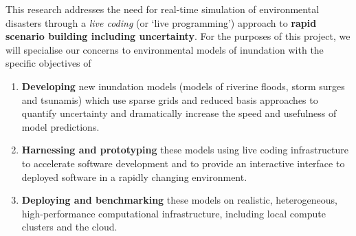 This research addresses the need for real-time simulation of
environmental disasters through a {\em live coding} (or ‘live programming’)
approach to {\bf rapid scenario building including uncertainty}. For the
purposes of this project, we will specialise our concerns to
environmental models of inundation with the specific objectives of
\begin{enumerate}

\item {\bf Developing} new inundation models (models of riverine floods,
  storm surges and tsunamis) which use sparse grids and reduced basis
  approaches to quantify uncertainty and dramatically increase the
  speed and usefulness of model predictions.

\item {\bf Harnessing and prototyping} these models using live coding
  infrastructure to accelerate software development and to provide an
  interactive interface to deployed software in a rapidly changing
  environment.

\item {\bf Deploying and benchmarking} these models on realistic,
  heterogeneous, high-performance computational infrastructure,
  including local compute clusters and the cloud.

\end{enumerate}

\iffalse
We will address this grand challenge through a \emph{live coding} (or
`live programming') approach to the development and deployment of
software systems for environmental simulation in the presence of
uncertainty. We will \textbf{develop} new `inundation models' (models
of riverine floods, storm surges and tsunamis) which use sparse grids
and uncertainty quantification to dramatically increase the speed and
usefulness of model predictions and their associated uncertainty. We
will \textbf{deploy} `live' distributed computing infrastructure to
\emph{rapidly prototype} the human interface to these new
environmental simulations and to transform the traditional,
batch-oriented workflow of environmental simulation into a highly
interactive one.
We will \textbf{evaluate team coordination and
decision-making} in the presence of uncertainty through role-playing
scenarios of representative flood and tsunami situations. 
\fi



